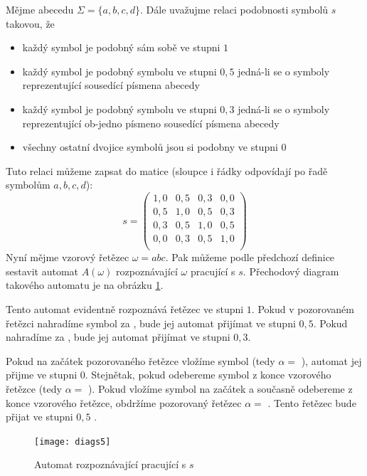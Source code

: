 \documentclass[a4paper,10pt]{article}
\begin{document}
\begin{example} \label{ex-AutRozpOmePodSym}
 Mějme abecedu $\Sigma = \{ a, b, c, d \}$. Dále uvažujme relaci podobnosti symbolů $s$ takovou, že
 \begin{itemize}
  \item každý symbol je podobný sám sobě ve stupni $1$
  \item každý symbol je podobný symbolu ve stupni $0,5$ jedná-li se o symboly reprezentující sousedící písmena abecedy
  \item každý symbol je podobný symbolu ve stupni $0,3$ jedná-li se o symboly reprezentující ob-jedno písmeno sousedící písmena abecedy
  \item všechny ostatní dvojice symbolů jsou si podobny ve stupni $0$
 \end{itemize}
 Tuto relaci můžeme zapsat do matice (sloupce i řádky odpovídají po řadě symbolům $a, b, c, d$):
 $$
 s = 
  \begin{pmatrix}
   1,0 	& 0,5	& 0,3	& 0,0 	\\
   0,5	& 1,0 	& 0,5	& 0,3	\\
   0,3	& 0,5	& 1,0 	& 0,5	\\
   0,0 	& 0,3	& 0,5	& 1,0 	\\
  \end{pmatrix}
 $$
 Nyní mějme vzorový řetězec $\omega = abc$. Pak můžeme podle předchozí definice sestavit automat $A(\omega)$ rozpoznávající $\omega$ pracující s $s$. Přechodový diagram takového automatu je na obrázku \ref{diag-AutRozpABCPracGS}.
 
 Tento automat evidentně rozpoznává řetězec  ve stupni $1$. Pokud v pozorovaném řetězci nahradíme symbol  za , bude jej automat přijímat ve stupni $0,5$. Pokud nahradíme  za , bude jej automat přijímat ve stupni $0,3$.
 
 Pokud na začátek pozorovaného řetězce vložíme symbol  (tedy $\alpha = $ ), automat jej přijme ve stupni $0$. Stejnětak, pokud odebereme symbol  z konce vzorového řetězce (tedy $\alpha = $ ). Pokud vložíme symbol  na začátek a současně odebereme  z konce vzorového řetězce, obdržíme pozorovaný řetězec $\alpha = $ . Tento řetězec bude přijat ve stupni $0,5$ .
 
  \begin{figure}
    \texttt{[image: diags5]}
    \caption{Automat rozpoznávající  pracující s $s$} \label{diag-AutRozpABCPracGS}
  \end{figure}
\end{example}
\end{document}
